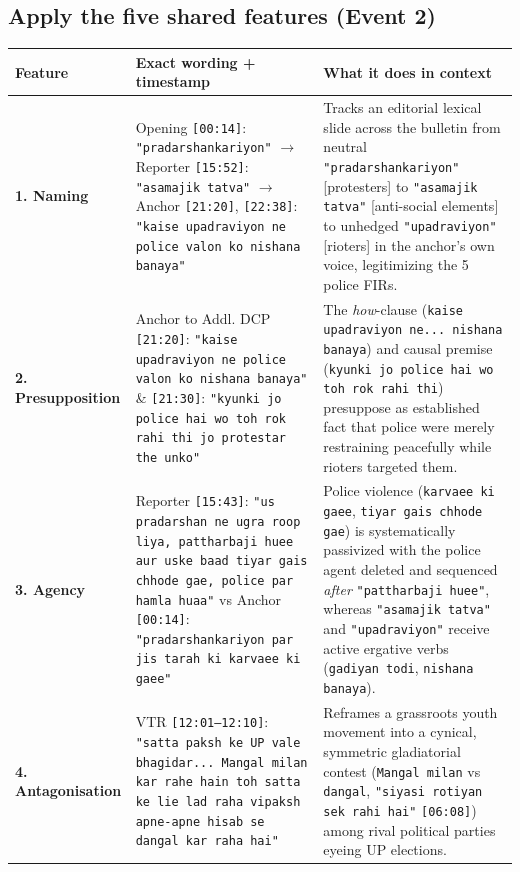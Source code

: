 \documentclass[10pt,a4paper]{article}
\begin{document}
\subsection*{Apply the five shared features (Event 2)}
\begin{longtable}{@{}>{\raggedright\arraybackslash}p{} >{\raggedright\arraybackslash}p{} >{\raggedright\arraybackslash}p{}@{}}
\toprule
\textbf{Feature} & \textbf{Exact wording + timestamp} & \textbf{What it does in context} \\
\midrule
\endhead
\textbf{1. Naming} & Opening \texttt{[00:14]}: \texttt{"pradarshankariyon"} $\rightarrow$ Reporter \texttt{[15:52]}: \texttt{"asamajik tatva"} $\rightarrow$ Anchor \texttt{[21:20]}, \texttt{[22:38]}: \texttt{"kaise upadraviyon ne police valon ko nishana banaya"} & Tracks an editorial lexical slide across the bulletin from neutral \texttt{"pradarshankariyon"} [protesters] to \texttt{"asamajik tatva"} [anti-social elements] to unhedged \texttt{"upadraviyon"} [rioters] in the anchor's own voice, legitimizing the 5 police FIRs. \\
\addlinespace[4pt]
\textbf{2. Presupposition} & Anchor to Addl. DCP \texttt{[21:20]}: \texttt{"kaise upadraviyon ne police valon ko nishana banaya"} \& \texttt{[21:30]}: \texttt{"kyunki jo police hai wo toh rok rahi thi jo protestar the unko"} & The \textit{how}-clause (\texttt{kaise upadraviyon ne... nishana banaya}) and causal premise (\texttt{kyunki jo police hai wo toh rok rahi thi}) presuppose as established fact that police were merely restraining peacefully while rioters targeted them. \\
\addlinespace[4pt]
\textbf{3. Agency} & Reporter \texttt{[15:43]}: \texttt{"us pradarshan ne ugra roop liya, pattharbaji huee aur uske baad tiyar gais chhode gae, police par hamla huaa"} vs Anchor \texttt{[00:14]}: \texttt{"pradarshankariyon par jis tarah ki karvaee ki gaee"} & Police violence (\texttt{karvaee ki gaee}, \texttt{tiyar gais chhode gae}) is systematically passivized with the police agent deleted and sequenced \textit{after} \texttt{"pattharbaji huee"}, whereas \texttt{"asamajik tatva"} and \texttt{"upadraviyon"} receive active ergative verbs (\texttt{gadiyan todi}, \texttt{nishana banaya}). \\
\addlinespace[4pt]
\textbf{4. Antagonisation} & VTR \texttt{[12:01--12:10]}: \texttt{"satta paksh ke UP vale bhagidar... Mangal milan kar rahe hain toh satta ke lie lad raha vipaksh apne-apne hisab se dangal kar raha hai"} & Reframes a grassroots youth movement into a cynical, symmetric gladiatorial contest (\texttt{Mangal milan} vs \texttt{dangal}, \texttt{"siyasi rotiyan sek rahi hai"} \texttt{[06:08]}) among rival political parties eyeing UP elections. \\

\end{longtable}
\end{document}
